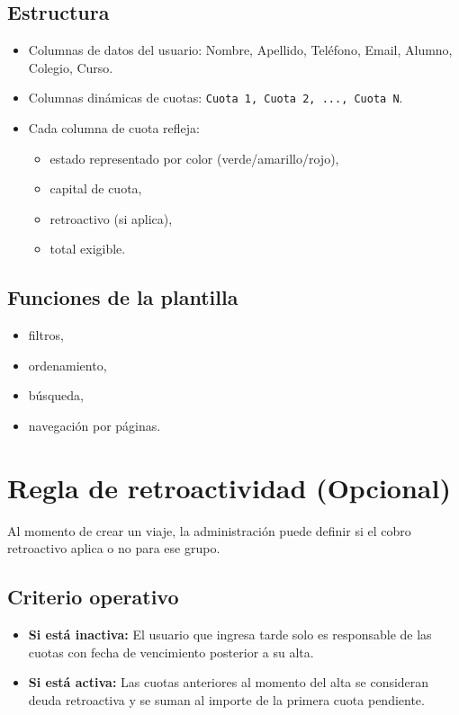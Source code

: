 \documentclass[12pt,a4paper]{article}
\begin{document}
\subsection*{Estructura}
\begin{itemize}[leftmargin=*]
    \item Columnas de datos del usuario: Nombre, Apellido, Teléfono, Email, Alumno, Colegio, Curso.
    \item Columnas dinámicas de cuotas: \texttt{Cuota 1, Cuota 2, ..., Cuota N}.
    \item Cada columna de cuota refleja:
    \begin{itemize}
        \item estado representado por color (verde/amarillo/rojo),
        \item capital de cuota,
        \item retroactivo (si aplica),
        \item total exigible.
    \end{itemize}
\end{itemize}

\subsection*{Funciones de la plantilla}
\begin{itemize}[leftmargin=*]
    \item filtros,
    \item ordenamiento,
    \item búsqueda,
    \item navegación por páginas.
\end{itemize}

\section{Regla de retroactividad (Opcional)}
Al momento de crear un viaje, la administración puede definir si el cobro retroactivo aplica o no para ese grupo.

\subsection*{Criterio operativo}
\begin{itemize}[leftmargin=*]
    \item \textbf{Si está inactiva:} El usuario que ingresa tarde solo es responsable de las cuotas con fecha de vencimiento posterior a su alta.
    \item \textbf{Si está activa:} Las cuotas anteriores al momento del alta se consideran deuda retroactiva y se suman al importe de la primera cuota pendiente.
\end{itemize}
\end{document}
